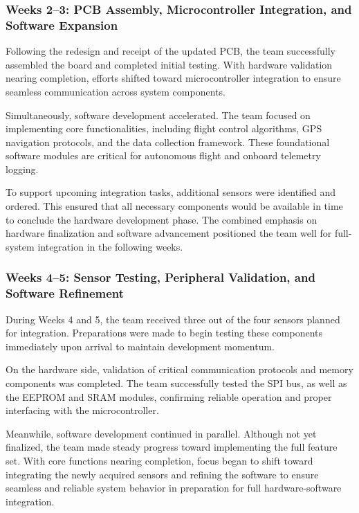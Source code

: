 \documentclass[12pt]{article}
\begin{document}
\subsubsection*{Weeks 2–3: PCB Assembly, Microcontroller Integration, and Software Expansion}

Following the redesign and receipt of the updated PCB, the team successfully assembled the board and completed initial testing. With hardware validation nearing completion, efforts shifted toward microcontroller integration to ensure seamless communication across system components.

Simultaneously, software development accelerated. The team focused on implementing core functionalities, including flight control algorithms, GPS navigation protocols, and the data collection framework. These foundational software modules are critical for autonomous flight and onboard telemetry logging.

To support upcoming integration tasks, additional sensors were identified and ordered. This ensured that all necessary components would be available in time to conclude the hardware development phase. The combined emphasis on hardware finalization and software advancement positioned the team well for full-system integration in the following weeks.

\subsubsection*{Weeks 4–5: Sensor Testing, Peripheral Validation, and Software Refinement}

During Weeks 4 and 5, the team received three out of the four sensors planned for integration. Preparations were made to begin testing these components immediately upon arrival to maintain development momentum.

On the hardware side, validation of critical communication protocols and memory components was completed. The team successfully tested the SPI bus, as well as the EEPROM and SRAM modules, confirming reliable operation and proper interfacing with the microcontroller.

Meanwhile, software development continued in parallel. Although not yet finalized, the team made steady progress toward implementing the full feature set. With core functions nearing completion, focus began to shift toward integrating the newly acquired sensors and refining the software to ensure seamless and reliable system behavior in preparation for full hardware-software integration.
\end{document}
